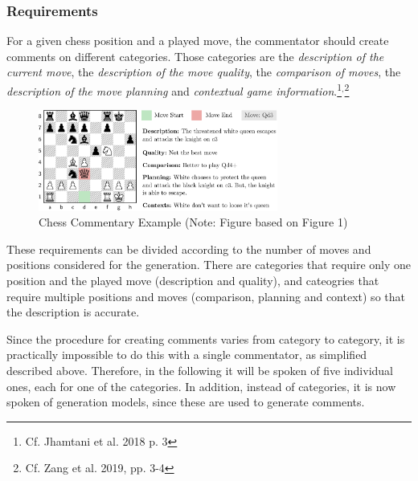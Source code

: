 \subsubsection{Requirements}

For a given chess position and a played move, the commentator should create comments on different categories. Those categories are the \textit{description of the current move}, the \textit{description of the move quality}, the \textit{comparison of moves}, the \textit{description of the move planning} and \textit{contextual game information}.\footnote{Cf. Jhamtani et al. 2018 p. 3}$^{,}$\footnote{Cf. Zang et al. 2019, pp. 3-4}

\begin{figure}[h]
\centering
\includegraphics[width=0.7\textwidth]{graphics/commentator_example/commentator.png}
\caption{Chess Commentary Example (Note: Figure based on \cite{zang-etal-2019-automated} Figure 1)}
\end{figure}

These requirements can be divided according to the number of moves and positions considered for the generation. There are categories that require only one position and the played move (description and quality), and cateogries that require multiple positions and moves (comparison, planning and context) so that the description is accurate.

Since the procedure for creating comments varies from category to category, it is practically impossible to do this with a single commentator, as simplified described above. Therefore, in the following it will be spoken of five individual ones, each for one of the categories. In addition, instead of categories, it is now spoken of generation models, since these are used to generate comments.


